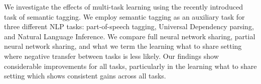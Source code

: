 We investigate the effects of multi-task learning using the recently introduced task of semantic tagging. We employ semantic tagging as an auxiliary task for three different NLP tasks: part-of-speech tagging, Universal Dependency parsing, and Natural Language Inference. We compare full neural network sharing, partial neural network sharing, and what we term the learning what to share setting where negative transfer between tasks is less likely. Our findings show considerable improvements for all tasks, particularly in the learning what to share setting which shows consistent gains across all tasks.
